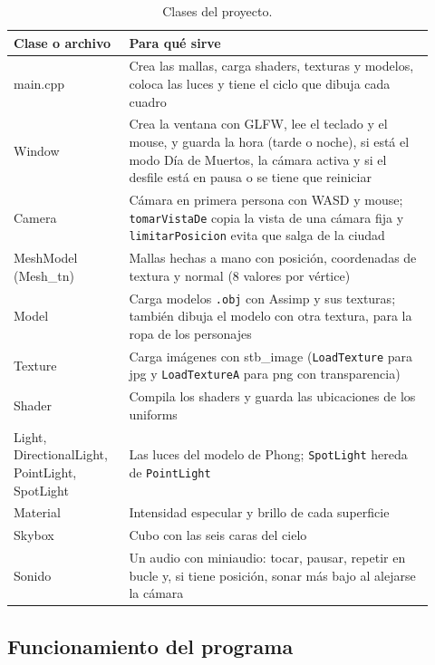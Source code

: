 \documentclass[11pt,a4paper]{article}
\begin{document}
\begin{table}[H]
  \centering
  \small
  \begin{tabular}{|>{\ttfamily}p{0.25\linewidth}|p{0.67\linewidth}|}
    \hline
    \textbf{Clase o archivo} & \textbf{Para qué sirve} \\ \hline
    main.cpp & Crea las mallas, carga shaders, texturas y modelos, coloca las luces y tiene el ciclo que dibuja cada cuadro \\ \hline
    Window & Crea la ventana con GLFW, lee el teclado y el mouse, y guarda la hora (tarde o noche), si está el modo Día de Muertos, la cámara activa y si el desfile está en pausa o se tiene que reiniciar \\ \hline
    Camera & Cámara en primera persona con WASD y mouse; \texttt{tomarVistaDe} copia la vista de una cámara fija y \texttt{limitarPosicion} evita que salga de la ciudad \\ \hline
    MeshModel (Mesh\_tn) & Mallas hechas a mano con posición, coordenadas de textura y normal (8 valores por vértice) \\ \hline
    Model & Carga modelos \texttt{.obj} con Assimp y sus texturas; también dibuja el modelo con otra textura, para la ropa de los personajes \\ \hline
    Texture & Carga imágenes con stb\_image (\texttt{LoadTexture} para jpg y \texttt{LoadTextureA} para png con transparencia) \\ \hline
    Shader & Compila los shaders y guarda las ubicaciones de los uniforms \\ \hline
    Light, DirectionalLight, PointLight, SpotLight & Las luces del modelo de Phong; \texttt{SpotLight} hereda de \texttt{PointLight} \\ \hline
    Material & Intensidad especular y brillo de cada superficie \\ \hline
    Skybox & Cubo con las seis caras del cielo \\ \hline
    Sonido & Un audio con miniaudio: tocar, pausar, repetir en bucle y, si tiene posición, sonar más bajo al alejarse la cámara \\ \hline
  \end{tabular}
  \caption{Clases del proyecto.}
\end{table}

\subsection{Funcionamiento del programa}
\end{document}
